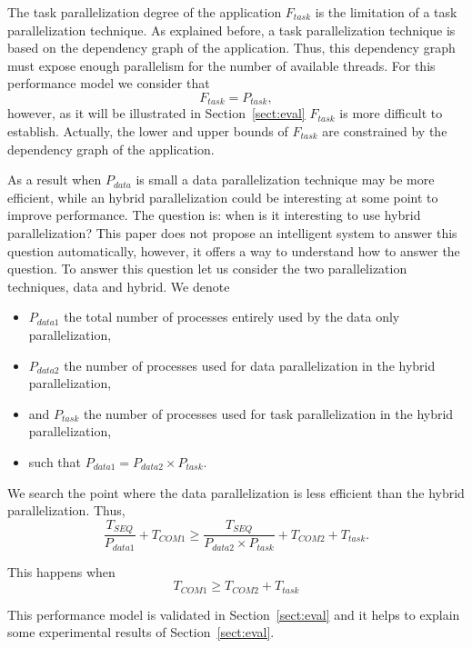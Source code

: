 The task parallelization degree of the application $F_{task}$ is the limitation of a task parallelization technique. As explained before, a task parallelization technique is based on the dependency graph of the application. Thus, this dependency graph must expose enough parallelism for the number of available threads. For this performance model we consider that 
\begin{equation*}
F_{task} = P_{task}, 
\end{equation*}
however, as it will be illustrated in Section~\ref{sect:eval} $F_{task}$ is more difficult to establish. Actually, the lower and upper bounds of $F_{task}$ are constrained by the dependency graph of the application.

\medskip
As a result when $P_{data}$ is small a data parallelization technique may be more efficient, while an hybrid parallelization could be interesting at some point to improve performance. The question is: when is it interesting to use hybrid parallelization? This paper does not propose an intelligent system to answer this question automatically, however, it offers a way to understand how to answer the question. To answer this question let us consider the two parallelization techniques, data and hybrid. We denote
\begin{itemize}
\item $P_{data1}$ the total number of processes entirely used by the data only parallelization,
\item $P_{data2}$ the number of processes used for data parallelization in the hybrid parallelization,
\item and $P_{task}$ the number of processes used for task parallelization in the hybrid parallelization,
\item such that $P_{data1} = P_{data2} \times P_{task}$.
\end{itemize}

We search the point where the data parallelization is less efficient than the hybrid parallelization. Thus, 
\begin{equation*}
\frac{T_{SEQ}}{P_{data1}} + T_{COM1} \geq \frac{T_{SEQ}}{P_{data2} \times P_{task}} + T_{COM2} + T_{task}.
\end{equation*}

This happens when
\begin{equation}
T_{COM1} \geq T_{COM2} + T_{task}
\label{eq:hyb}
\end{equation}

This performance model is validated in Section~\ref{sect:eval} and it helps to explain some experimental results of Section~\ref{sect:eval}.
